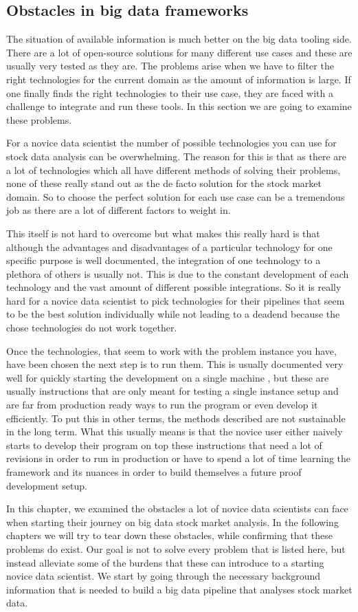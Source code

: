 \subsection{Obstacles in big data frameworks}

The situation of available information is much better on the big data tooling side.
There are a lot of open-source solutions for many different use cases and these are usually very tested as they are.
The problems arise when we have to filter the right technologies for the current domain as the amount of information is large.
If one finally finds the right technologies to their use case, they are faced with a challenge to integrate and run these tools. 
In this section we are going to examine these problems.

For a novice data scientist the number of possible technologies you can use for stock data analysis can be overwhelming.
The reason for this is that as there are a lot of technologies which all have different methods of solving their problems, none of these really stand out as the de facto solution for the stock market domain.
So to choose the perfect solution for each use case can be a tremendous job as there are a lot of different factors to weight in.

This itself is not hard to overcome but what makes this really hard is that although the advantages and disadvantages of a particular technology for one specific purpose is well documented, the integration of one technology to a plethora of others is usually not.
This is due to the constant development of each technology and the vast amount of different possible integrations.
So it is really hard for a novice data scientist to pick technologies for their pipelines that seem to be the best solution individually while not leading to a deadend because the chose technologies do not work together.

Once the technologies, that seem to work with the problem instance you have, have been chosen the next step is to run them.
This is usually documented very well for quickly starting the development on a single machine \cite{kafka} \cite{flume}, but these are usually instructions that are only meant for testing a single instance setup and are far from production ready ways to run the program or even develop it efficiently.
To put this in other terms, the methods described are not sustainable in the long term.
What this usually means is that the novice user either naively starts to develop their program on top these instructions that need a lot of revisions in order to run in production or have to spend a lot of time learning the framework and its nuances in order to build themselves a future proof development setup.

In this chapter, we examined the obstacles a lot of novice data scientists can face when starting their journey on big data stock market analysis.
In the following chapters we will try to tear down these obstacles, while confirming that these problems do exist.
Our goal is not to solve every problem that is listed here, but instead alleviate some of the burdens that these can introduce to a starting novice data scientist.
We start by going through the necessary background information that is needed to build a big data pipeline that analyses stock market data.
